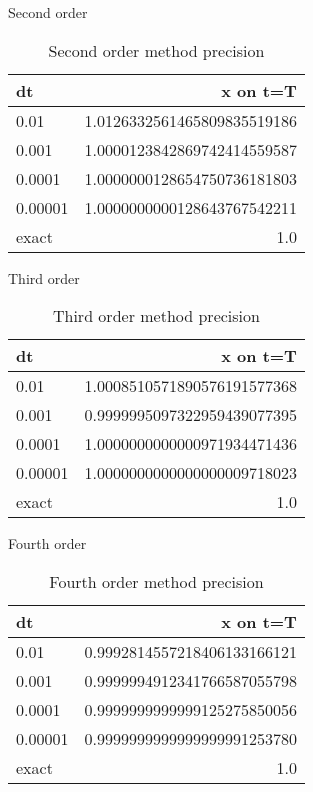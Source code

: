 \documentclass[10pt]{beamer}
\begin{document}
\begin{frame}{Second order}
  \begin{table}
    \caption{Second order method precision}
    \begin{tabular}{lr}
      \toprule
      dt & x on t=T\\
      \midrule
      0.01 & 1.0126332561465809835519186\\
      0.001 & 1.0000123842869742414559587\\
      0.0001 & 1.0000000128654750736181803\\
      0.00001 & 1.0000000000128643767542211\\
      \midrule
      exact & 1.0 \\
      \bottomrule
    \end{tabular}
  \end{table}
\end{frame}

\begin{frame}{Third order}
  \begin{table}
    \caption{Third order method precision}
    \begin{tabular}{lr}
      \toprule
      dt & x on t=T\\
      \midrule
      0.01 & 1.0008510571890576191577368\\
      0.001 & 0.9999995097322959439077395\\
      0.0001 & 1.0000000000000971934471436\\
      0.00001 & 1.0000000000000000009718023\\
      \midrule
      exact & 1.0 \\
      \bottomrule
    \end{tabular}
  \end{table}
\end{frame}

\begin{frame}{Fourth order}
  \begin{table}
    \caption{Fourth order method precision}
    \begin{tabular}{lr}
      \toprule
      dt & x on t=T\\
      \midrule
      0.01 & 0.9992814557218406133166121\\
      0.001 & 0.9999994912341766587055798\\
      0.0001 & 0.9999999999999125275850056\\
      0.00001 & 0.9999999999999999991253780\\
      \midrule
      exact & 1.0 \\
      \bottomrule
    \end{tabular}
  \end{table}
\end{frame}
\end{document}
